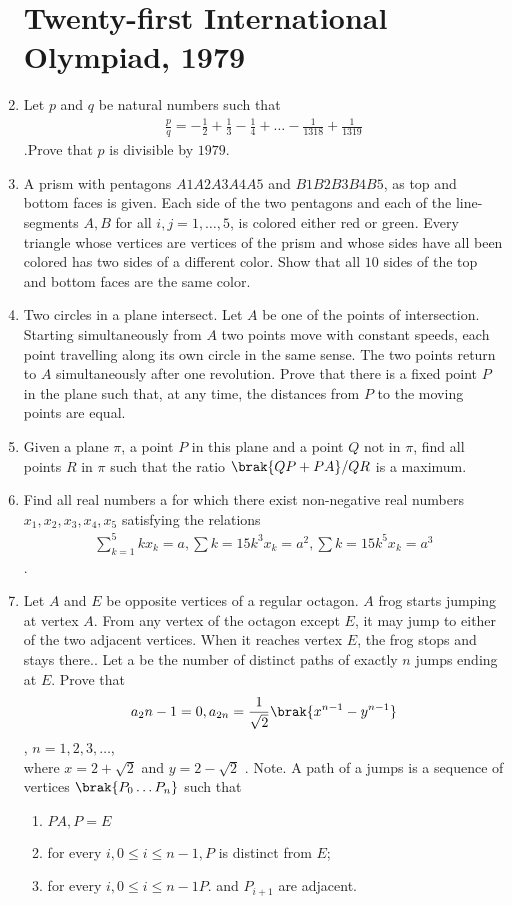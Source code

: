 \documentclass[12pt,-letter paper] {article}
\begin{document}
\begin{enumerate}
	\newpage \section*{Twenty-first International Olympiad, 1979}
\item Let $p$ and $q$ be natural numbers such that \begin{align}\frac{p}{q}=-\frac{1}{2}+\frac{1}{3}-\frac{1}{4}+\ldots -\frac{1}{1318}+\frac{1}{1319}\end{align}.Prove that $p$ is divisible by $1979$.
\item A prism with pentagons $A1 A2 A3 A4 A5$ and $B1 B2 B3 B4 B5$, as top and bottom faces is given. Each side of the two pentagons and each of the line- segments $A,B$ for all $i, j = 1 ,\ldots,5$, is colored either red or green. Every triangle whose vertices are vertices of the prism and whose sides have all been colored has two sides of a different color. Show that all $10$ sides of the top and bottom faces are the same color.
\item Two circles in a plane intersect. Let $A$ be one of the points of intersection. Starting simultaneously from $A$ two points move with constant speeds, each point travelling along its own circle in the same sense. The two points return to $A$ simultaneously after one revolution. Prove that there is a fixed point $P$ in the plane such that, at any time, the distances from $P$ to the moving points are equal.

\item Given a plane $\pi$, a point $P$ in this plane and a point $Q$ not in $\pi$, find all points $R$ in $\pi$ such that the ratio $\brak{QP+PA}/QR$ is a maximum. 
\item Find all real numbers a for which there exist non-negative real numbers $x_1, x_2, x_3, x_4, x_5$ satisfying the relations \begin{align}\sum_{k=1}^{5}kx_{k}=a,\sum{k=1}{5}k^{3}x_{k}=a^2,\sum{k=1}{5}k^{5}x_{k}=a^3\end{align}.
	\item Let $A$ and $E$ be opposite vertices of a regular octagon. $A$ frog starts jumping at vertex $A$. From any vertex of the octagon except $E$, it may jump to either of the two adjacent vertices. When it reaches vertex $E$, the frog stops and stays there.. Let a be the number of distinct paths of exactly $n$ jumps ending at $E$. Prove that 
\begin{align}a_2n-1=0, a_{2n} = \frac{1}{\sqrt{2}}\brak{x^{n - 1} - y^{n - 1}}\end{align},
$n = 1, 2, 3 ,\ldots$,\\
	where $x = 2 + \sqrt{2}$ and $y = 2 - \sqrt{2}$ . Note. A path of a jumps is a sequence of vertices $\brak{P_0\ldots P_n}$ such that
\begin{enumerate}
\item $PA, P = E$
\item for every $i, 0 \leq i \leq n - 1, P$ is distinct from $E$;
\item for every $i, 0 \leq i \leq n - 1 P$. and $P_{i+1}$ are adjacent.\end{enumerate}
\end{enumerate}
\end{document}
